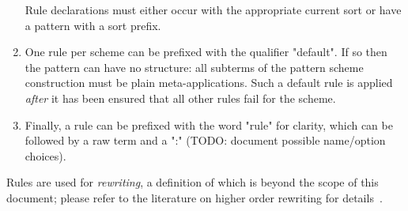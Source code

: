 \documentclass[11pt]{article} %
\begin{document}
\begin{manual}
\begin{enumerate}
    Rule declarations must either occur with the appropriate current sort or have a pattern with a
    sort prefix.

  \item One rule per scheme can be prefixed with the qualifier "default". If so then the pattern can
    have no structure: all subterms of the pattern scheme construction must be plain
    meta-applications. Such a default rule is applied \emph{after} it has been ensured that all
    other rules fail for the scheme.

  \item Finally, a rule can be prefixed with the word "rule" for clarity, which can be followed by a
    raw term and a ":" (TODO: document possible name/option choices).

  \end{enumerate}
  Rules are used for \emph{rewriting}, a definition of which is beyond the scope of this document;
  please refer to the literature on higher order rewriting for details~\cite{Klop+:tcs1993}.
\end{manual}
\end{document}
